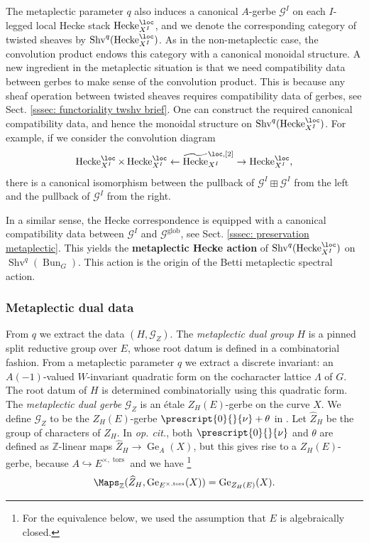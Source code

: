 \documentclass[10pt]{amsart}
\newcommand{\sssec}{\subsubsection}
\theoremstyle{remark}
\newcommand{\wt}{\widetilde}
\newcommand{\wh}{\widehat}
\newcommand{\Z}{\mathbb{Z}}
\newcommand{\on}{\operatorname}
\newcommand{\cG}{\mathcal{G}}
\newcommand{\Shv}{\on{Shv}}
\newcommand{\Hecke}{\on{Hecke}}
\newcommand{\Bun}{\on{Bun}}
\begin{document}
The metaplectic parameter $q$ also induces a canonical $A$-gerbe $\cG^I$ on each $I$-legged local Hecke stack $\Hecke^{\loc}_{X^I}$, and we denote the corresponding category of twisted sheaves by $\Shv^q(\Hecke^{\loc}_{X^I})$. As in the non-metaplectic case, the convolution product endows this category with a canonical monoidal structure. A new ingredient in the metaplectic situation is that we need compatibility data between gerbes to make sense of the convolution product. This is because any sheaf operation between twisted sheaves requires compatibility data of gerbes, see Sect. \ref{sssec: functoriality twshv brief}. One can construct the required canonical compatibility data, and hence the monoidal structure on $\Shv^q(\Hecke^{\loc}_{X^I})$. For example, if we consider the convolution diagram
\[\Hecke^{\loc}_{X^I}\times\Hecke^{\loc}_{X^I}\leftarrow \wt{\Hecke}^{\loc,[2]}_{X^I}\rightarrow \Hecke^{\loc}_{X^I},\]
there is a canonical isomorphism between the pullback of $\cG^I\boxplus\cG^I$ from the left and the pullback of $\cG^I$ from the right. 
\medskip

In a similar sense, the Hecke correspondence is equipped with a canonical compatibility data between $\cG^I$ and $\cG^{\on{glob}}$, see Sect. \ref{sssec: preservation metaplectic}. This yields the \textbf{metaplectic Hecke action} of $\Shv^q(\Hecke^{\loc}_{X^I})$ on $\Shv^q(\Bun_G)$. This action is the origin of the Betti metaplectic spectral action. 

\sssec{Metaplectic dual data}\label{sssec: dual data}
From $q$ we extract the data $(H,\cG_Z)$. The \emph{metaplectic dual group} $H$ is a pinned split reductive group over $E$, whose root datum is defined in a combinatorial fashion. From a metaplectic parameter $q$ we extract a discrete invariant: an $A(-1)$-valued $W$-invariant quadratic form on the cocharacter lattice $\Lambda$ of $G$. The root datum of $H$ is determined combinatorially using this quadratic form. The \emph{metaplectic dual gerbe} $\cG_Z$ is an \'etale $Z_H(E)$-gerbe on the curve $X$. We define $\cG_Z$ to be the $Z_H(E)$-gerbe $\prescript{0}{}{\nu}+\theta$ in \cite[Sect. 2.2.6]{ZhaoNew}. Let $\wh{Z}_H$ be the group of characters of $Z_H$. In \emph{op. cit.}, both $\prescript{0}{}{\nu}$ and $\theta$ are defined as $\Z$-linear maps $\wh{Z}_H\rightarrow \on{Ge}_A(X)$, but this gives rise to a $Z_H(E)$-gerbe, because $A\hookrightarrow E^{\times,\on{tors}}$ and we have \footnote{For the equivalence below, we used the assumption that $E$ is algebraically closed.}
\[\Maps_{\Z}(\wh{Z}_H,\on{Ge}_{E^{\times,\on{tors}}}(X))= \on{Ge}_{Z_H(E)}(X).\]
\end{document}
